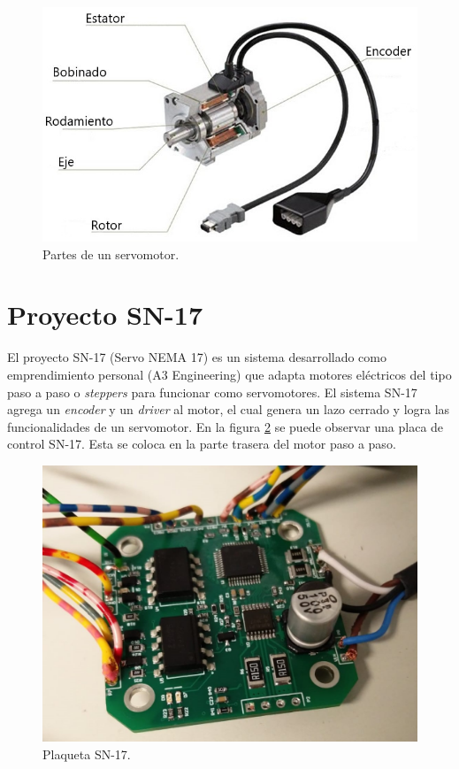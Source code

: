 \begin{figure}[htbp]
	\centering
	\includegraphics[scale=0.8]{./Figures/servomotor.jpg}
	\caption{Partes de un servomotor\protect\footnotemark .}
	\label{fig:servomotor}
\end{figure}



\section{Proyecto SN-17}

El proyecto SN-17 (Servo NEMA 17) es un sistema desarrollado como emprendimiento personal (A3 Engineering) que adapta motores eléctricos del tipo paso a paso o \textit{steppers} para funcionar como servomotores. El sistema SN-17 agrega un \textit{encoder} y un \textit{driver} al motor, el cual genera un lazo cerrado y logra las funcionalidades de un servomotor. En la figura \ref{fig:SN17} se puede observar una placa de control SN-17. Esta se coloca en la parte trasera del motor paso a paso.

\begin{figure}[htbp]
	\centering
	\includegraphics[scale=.35]{./Figures/SN17_5.jpeg}
	\caption{Plaqueta SN-17.}
	\label{fig:SN17}
\end{figure}

